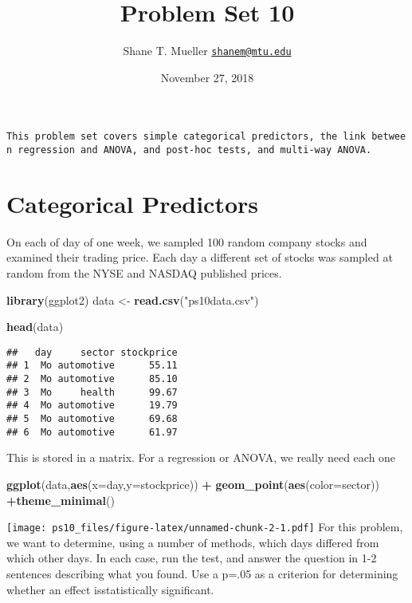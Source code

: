 \documentclass[]{article}
\title{Problem Set 10}
\author{Shane T. Mueller
\href{mailto:shanem@mtu.edu}{\nolinkurl{shanem@mtu.edu}}}
\date{November 27, 2018}
\newenvironment{Shaded}{\begin{snugshade}}{\end{snugshade}}
\newcommand{\KeywordTok}[1]{\textcolor[rgb]{0.13,0.29,0.53}{\textbf{#1}}}
\newcommand{\DataTypeTok}[1]{\textcolor[rgb]{0.13,0.29,0.53}{#1}}
\newcommand{\StringTok}[1]{\textcolor[rgb]{0.31,0.60,0.02}{#1}}
\newcommand{\OperatorTok}[1]{\textcolor[rgb]{0.81,0.36,0.00}{\textbf{#1}}}
\newcommand{\NormalTok}[1]{#1}
\begin{document}
\maketitle

\texttt{This\ problem\ set\ covers\ simple\ categorical\ predictors,\ the\ link\ between\ regression\ and\ ANOVA,\ and\ post-hoc\ tests,\ and\ multi-way\ ANOVA.}

\section{Categorical Predictors}\label{categorical-predictors}

On each of day of one week, we sampled 100 random company stocks and
examined their trading price. Each day a different set of stocks was
sampled at random from the NYSE and NASDAQ published prices.

\begin{Shaded}
\begin{Highlighting}[]
\KeywordTok{library}\NormalTok{(ggplot2)}
\NormalTok{data <-}\StringTok{ }\KeywordTok{read.csv}\NormalTok{(}\StringTok{"ps10data.csv"}\NormalTok{)}

\KeywordTok{head}\NormalTok{(data)}
\end{Highlighting}
\end{Shaded}

\begin{verbatim}
##   day     sector stockprice
## 1  Mo automotive      55.11
## 2  Mo automotive      85.10
## 3  Mo     health      99.67
## 4  Mo automotive      19.79
## 5  Mo automotive      69.68
## 6  Mo automotive      61.97
\end{verbatim}

This is stored in a matrix. For a regression or ANOVA, we really need
each one

\begin{Shaded}
\begin{Highlighting}[]
\KeywordTok{ggplot}\NormalTok{(data,}\KeywordTok{aes}\NormalTok{(}\DataTypeTok{x=}\NormalTok{day,}\DataTypeTok{y=}\NormalTok{stockprice)) }\OperatorTok{+}\StringTok{ }\KeywordTok{geom_point}\NormalTok{(}\KeywordTok{aes}\NormalTok{(}\DataTypeTok{color=}\NormalTok{sector)) }\OperatorTok{+}\KeywordTok{theme_minimal}\NormalTok{()}
\end{Highlighting}
\end{Shaded}

\texttt{[image: ps10\_files/figure-latex/unnamed-chunk-2-1.pdf]} For this
problem, we want to determine, using a number of methods, which days
differed from which other days. In each case, run the test, and answer
the question in 1-2 sentences describing what you found. Use a p=.05 as
a criterion for determining whether an effect isstatistically
significant.
\end{document}
